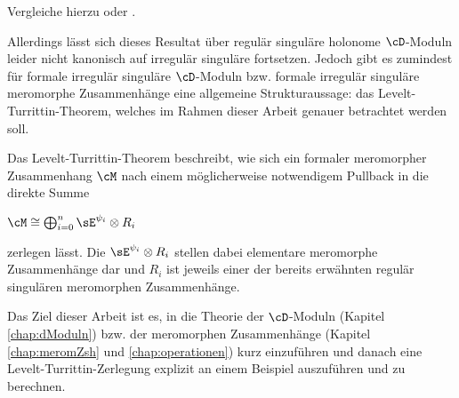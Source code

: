   \begin{center}
  \end{center}
\fi
Vergleiche hierzu \cite[Sec 6]{REFKashiwara1984} oder \cite[Thm
7.2.1]{hotta2007d}.

Allerdings lässt sich dieses Resultat über regulär singuläre holonome
$\cD$-Moduln leider nicht kanonisch auf irregulär singuläre fortsetzen.
Jedoch gibt es zumindest für formale irregulär singuläre $\cD$-Moduln bzw. 
formale irregulär singuläre meromorphe Zusammenhänge eine allgemeine
Strukturaussage: das Levelt-Turrittin-Theorem, welches im Rahmen dieser Arbeit
genauer betrachtet werden soll.

Das Levelt-Turrittin-Theorem beschreibt, wie sich ein formaler meromorpher
Zusammenhang $\cM$ nach einem möglicherweise notwendigem Pullback in die
direkte Summe
\begin{center}
$ \cM \cong \bigoplus_{i=0}^n \sE^{\psi_i}\otimes R_i $
\end{center}
zerlegen lässt.
Die $\sE^{\psi_i}\otimes R_i$ stellen dabei elementare meromorphe Zusammenhänge
dar und $R_i$ ist jeweils einer der bereits erwähnten regulär singulären
meromorphen Zusammenhänge.

Das Ziel dieser Arbeit ist es, in die Theorie der $\cD$-Moduln (Kapitel
\ref{chap:dModuln}) bzw. der meromorphen Zusammenhänge (Kapitel
\ref{chap:meromZsh} und \ref{chap:operationen}) kurz einzuführen und danach
eine Levelt-Turrittin-Zerlegung explizit an einem Beispiel auszuführen und zu
berechnen.
\begin{comment}
Die Riemann-Hilbert-Korrespondenz und die Theorie der Stokes-Strukturen werden
in dieser Arbeit nicht weiter betrachtet.
\end{comment}

\begin{comment}
Es wird in dieser Arbeit kein Vorwissen über $\cD$-Moduln bzw. meromorphe
Zusammenhänge vorausgesetzt, diese beiden Begriffe werden in den ersten Zwei
Kapiteln eingeführt.
\end{comment}

